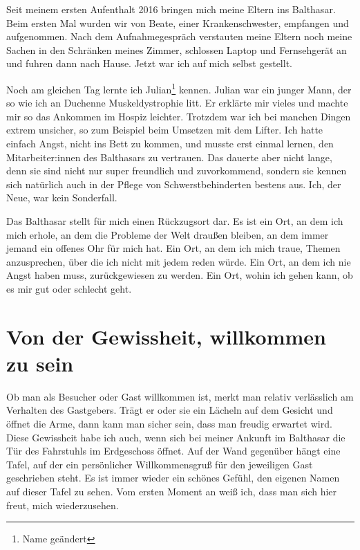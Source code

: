 \documentclass[fontsize=14pt,a4paper,headinclude,DIV=calc,automark]{scrbook}
\begin{document}
Seit meinem ersten Aufenthalt 2016 bringen mich meine Eltern ins Balthasar. Beim ersten Mal wurden wir von Beate, einer Krankenschwester, empfangen und aufgenommen. Nach dem Aufnahmegespräch verstauten meine Eltern noch meine Sachen in den Schränken meines Zimmer, schlossen Laptop und Fernsehgerät an und fuhren dann nach Hause. Jetzt war ich auf mich selbst gestellt.

Noch am gleichen Tag lernte ich Julian\footnote{Name geändert} kennen. Julian war ein junger Mann, der so wie ich an Duchenne Muskeldystrophie litt. Er erklärte mir vieles und machte mir so das Ankommen im Hospiz leichter. Trotzdem war ich bei manchen Dingen extrem unsicher, so zum Beispiel beim Umsetzen mit dem Lifter. Ich hatte einfach Angst, nicht ins Bett zu kommen, und musste erst einmal lernen, den Mitarbeiter:innen des Balthasars zu vertrauen. Das dauerte aber nicht lange, denn sie sind nicht nur super freundlich und zuvorkommend, sondern sie kennen sich natürlich auch in der Pflege von Schwerstbehinderten bestens aus. Ich, der Neue, war kein Sonderfall.

Das Balthasar stellt für mich einen Rückzugsort dar. Es ist ein Ort, an dem ich mich erhole, an dem die Probleme der Welt draußen bleiben, an dem immer jemand ein offenes Ohr für mich hat. Ein Ort, an dem ich mich traue, Themen anzusprechen, über die ich nicht mit jedem reden würde. Ein Ort, an dem ich nie Angst haben muss, zurückgewiesen zu werden. Ein Ort, wohin ich gehen kann, ob es mir gut oder schlecht geht.

\section{Von der Gewissheit, willkommen zu sein}

Ob man als Besucher oder Gast willkommen ist, merkt man relativ verlässlich am Verhalten des Gastgebers. Trägt er oder sie ein Lächeln auf dem Gesicht und öffnet die Arme, dann kann man sicher sein, dass man freudig erwartet wird. Diese Gewissheit habe ich auch, wenn sich bei meiner Ankunft im Balthasar die Tür des Fahrstuhls im Erdgeschoss öffnet. Auf der Wand gegenüber hängt eine Tafel, auf der ein persönlicher Willkommensgruß für den jeweiligen Gast geschrieben steht. Es ist immer wieder ein schönes Gefühl, den eigenen Namen auf dieser Tafel zu sehen. Vom ersten Moment an weiß ich, dass man sich hier freut, mich wiederzusehen.
\end{document}
